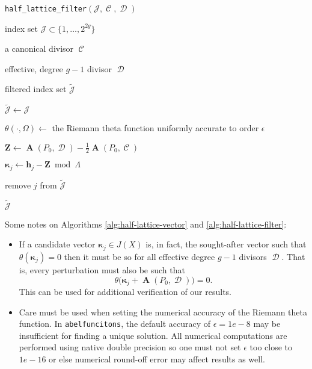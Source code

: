 \documentclass[12pt]{article}
\theoremstyle{definition}
\DeclareMathOperator{\DivC}{\mathcal{C}}
\DeclareMathOperator{\DivD}{\mathcal{D}}
\DeclareMathOperator{\Abel}{\boldsymbol{A}}
\begin{document}
\begin{algorithm}
\caption{{\tt half\_lattice\_filter}$(\mathcal{J},\DivC,\DivD)$}
\label{alg:half-lattice-filter}
\begin{algorithmic}[1]

  \Require index set $\mathcal{J} \subset \{1, \ldots, 2^{2g}\}$

  \Require a canonical divisor $\DivC$

  \Require effective, degree $g-1$ divisor $\DivD$

  \Ensure filtered index set $\tilde{\mathcal{J}}$

  \State $\tilde{\mathcal{J}} \gets \mathcal{J}$

  \State $\theta( \cdot, \Omega) \gets$ the Riemann theta function
  uniformly accurate to order $\epsilon$

  \State $\boldsymbol{Z} \gets \Abel(P_0,\DivD) - \tfrac{1}{2}
  \Abel(P_0,\DivC)$


      \State $\boldsymbol{\kappa}_j \gets \boldsymbol{h}_j - \boldsymbol{Z}
      \bmod{\Lambda}$


          \State remove $j$ from $\tilde{\mathcal{J}}$

      \EndIf

  \EndFor

  \State \Return $\tilde{\mathcal{J}}$

\end{algorithmic}
\end{algorithm}

Some notes on Algorithms \ref{alg:half-lattice-vector} and
\ref{alg:half-lattice-filter}:
\begin{itemize}
  \item If a candidate vector $\boldsymbol{\kappa}_j \in J(X)$ is, in
    fact, the sought-after vector such that
    $\theta(\boldsymbol{\kappa}_j) = 0$ then it must be so for all
    effective degree $g-1$ divisors $\DivD$. That is, every perturbation
    must also be such that
    \begin{equation}
      \theta\big(\boldsymbol{\kappa}_j + \Abel(P_0,\DivD)\big) = 0.
    \end{equation}
    This can be used for additional verification of our results.
  \item Care must be used when setting the numerical accuracy of the
    Riemann theta function. In {\tt abelfuncitons}, the default accuracy
    of $\epsilon = 1e-8$ may be insufficient for finding a unique
    solution. All numerical computations are performed using native
    double precision so one must not set $\epsilon$ too close to $1e-16$
    or else numerical round-off error may affect results as well.
\end{itemize}
\end{document}
